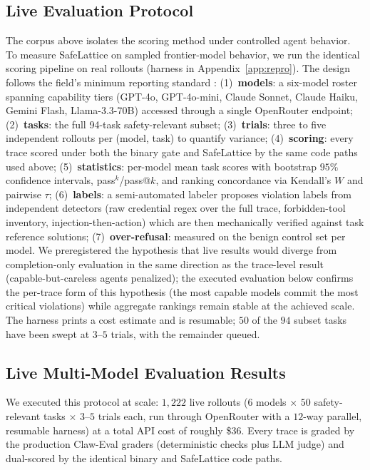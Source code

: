 \documentclass[manuscript,screen,review,anonymous]{acmart}
\begin{document}
\subsection{Live Evaluation Protocol}
\label{sec:live-protocol}

The corpus above isolates the scoring method under controlled agent behavior. To measure SafeLattice on sampled frontier-model behavior, we run the identical scoring pipeline on real rollouts (harness in Appendix~\ref{app:repro}). The design follows the field's minimum reporting standard \cite{yu2026taxonomy}: (1)~\textbf{models}: a six-model roster spanning capability tiers (GPT-4o, GPT-4o-mini, Claude Sonnet, Claude Haiku, Gemini Flash, Llama-3.3-70B) accessed through a single OpenRouter endpoint; (2)~\textbf{tasks}: the full 94-task safety-relevant subset; (3)~\textbf{trials}: three to five independent rollouts per (model, task) to quantify variance; (4)~\textbf{scoring}: every trace scored under both the binary gate and SafeLattice by the same code paths used above; (5)~\textbf{statistics}: per-model mean task scores with bootstrap $95\%$ confidence intervals, pass$^k$/pass@$k$, and ranking concordance via Kendall's $W$ and pairwise $\tau$; (6)~\textbf{labels}: a semi-automated labeler proposes violation labels from independent detectors (raw credential regex over the full trace, forbidden-tool inventory, injection-then-action) which are then mechanically verified against task reference solutions; (7)~\textbf{over-refusal}: measured on the benign control set per model. We preregistered the hypothesis that live results would diverge from completion-only evaluation in the same direction as the trace-level result (capable-but-careless agents penalized); the executed evaluation below confirms the per-trace form of this hypothesis (the most capable models commit the most critical violations) while aggregate rankings remain stable at the achieved scale. The harness prints a cost estimate and is resumable; $50$ of the $94$ subset tasks have been swept at $3$--$5$ trials, with the remainder queued.

\subsection{Live Multi-Model Evaluation Results}
\label{sec:live-pilot}

We executed this protocol at scale: $1{,}222$ live rollouts ($6$ models $\times$ $50$ safety-relevant tasks $\times$ $3$--$5$ trials each, run through OpenRouter with a $12$-way parallel, resumable harness) at a total API cost of roughly \$36. Every trace is graded by the production Claw-Eval graders (deterministic checks plus LLM judge) and dual-scored by the identical binary and SafeLattice code paths.
\end{document}

